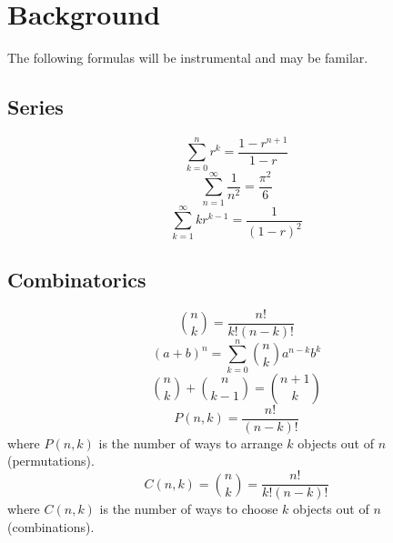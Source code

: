 \section{Background}

The following formulas will be instrumental and may be familar.

\subsection{Series}
\begin{equation}
    \sum_{k=0}^{n} r^k = \frac{1 - r^{n + 1}}{1 - r}
\end{equation}
\begin{equation}
    \sum_{n=1}^{\infty} \frac{1}{n^2} = \frac{\pi^2}{6}
\end{equation}
\begin{equation}
    \sum_{k=1}^{\infty}kr^{k - 1} = \frac{1}{(1 - r)^2}
\end{equation}

\subsection{Combinatorics}
\begin{equation}
    {n\choose k} = \frac{n!}{k!(n - k)!}
\end{equation}
\begin{equation}
    (a + b)^n = \sum_{k=0}^{n} {n\choose k} a^{n - k}b^k
\end{equation}
\begin{equation}
    {n\choose k} + {n\choose k-1} = {n + 1\choose k}
\end{equation}
\begin{equation}
    P(n, k) = \frac{n!}{(n-k)!}
\end{equation}
where $P(n, k)$ is the number of ways to arrange $k$ objects out of $n$ (permutations).
\begin{equation}
    C(n, k) = {n\choose k} = \frac{n!}{k!(n-k)!}
\end{equation}
where $C(n, k)$ is the number of ways to choose $k$ objects out of $n$ (combinations).

